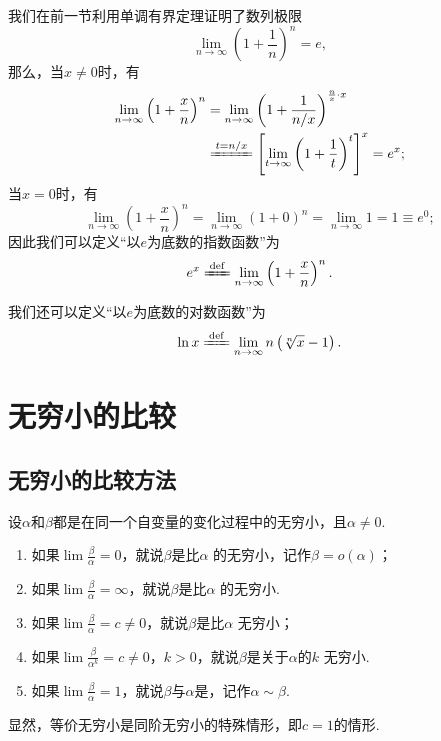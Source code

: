 我们在前一节利用单调有界定理证明了数列极限\[
\lim\limits_{n\to\infty} \left(1+\frac{1}{n}\right)^n = e,
\]
那么，当\(x\neq0\)时，有
\begin{align*}
\lim\limits_{n\to\infty} \left(1+\frac{x}{n}\right)^n
&= \lim\limits_{n\to\infty} \left(1+\frac{1}{n/x}\right)^{\frac{n}{x} \cdot x} \\
&\xlongequal{t=n/x} \left[ \lim\limits_{t\to\infty} \left(1+\frac{1}{t}\right)^t \right]^x
= e^x;
\end{align*}
当\(x=0\)时，有\[
\lim\limits_{n\to\infty} \left(1+\frac{x}{n}\right)^n
= \lim\limits_{n\to\infty} (1+0)^n
= \lim\limits_{n\to\infty} 1
= 1 \equiv e^0;
\]
因此我们可以定义“以\(e\)为底数的指数函数”为
\begin{equation}\label{equation:特殊函数.以e为底数的指数函数的极限定义}
e^x
\defeq
\lim\limits_{n\to\infty} \left(1+\frac{x}{n}\right)^n.
\end{equation}

我们还可以定义“以\(e\)为底数的对数函数”为
\begin{equation}\label{equation:特殊函数.以e为底数的对数函数的极限定义}
\ln x
\defeq
\lim\limits_{n\to\infty} n \left( \sqrt[n]{x} - 1 \right).
\end{equation}

\section{无穷小的比较}
\subsection{无穷小的比较方法}
\begin{definition}
\newcommand{\lf}[1][]{\lim \frac{\beta}{\alpha^{#1}}}
设\(\alpha\)和\(\beta\)都是在同一个自变量的变化过程中的无穷小，且\(\alpha\neq0\).
\begin{enumerate}
\item 如果\(\lf=0\)，就说\(\beta\)是比\(\alpha\) 的无穷小，记作\(\beta=o(\alpha)\)；
\item 如果\(\lf=\infty\)，就说\(\beta\)是比\(\alpha\) 的无穷小.
\item 如果\(\lf=c\neq0\)，就说\(\beta\)是比\(\alpha\) 无穷小；
\item 如果\(\lf[k]=c\neq0\)，\(k>0\)，就说\(\beta\)是关于\(\alpha\)的\(k\) 无穷小.
\item 如果\(\lf=1\)，就说\(\beta\)与\(\alpha\)是，记作\(\alpha\sim\beta\).
\end{enumerate}
\end{definition}
显然，等价无穷小是同阶无穷小的特殊情形，即\(c=1\)的情形.

